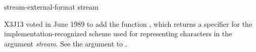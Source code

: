 \begin{defun}[Function]
stream-external-format stream

X3J13 voted in June 1989  to add the
function , which returns a
specifier for the implementation-recognized scheme used for
representing characters in the argument \emph{stream}.
See the  argument to .
\end{defun}

\fi